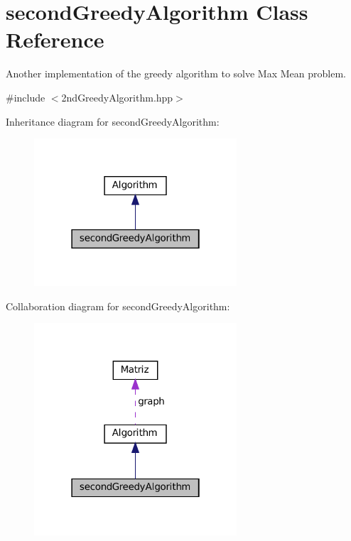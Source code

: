\hypertarget{classsecondGreedyAlgorithm}{}\section{second\+Greedy\+Algorithm Class Reference}
\label{classsecondGreedyAlgorithm}


Another implementation of the greedy algorithm to solve Max Mean problem.  




{\ttfamily \#include $<$2nd\+Greedy\+Algorithm.\+hpp$>$}



Inheritance diagram for second\+Greedy\+Algorithm\+:\nopagebreak
\begin{figure}[H]
\begin{center}
\leavevmode
\includegraphics[width=214pt]{classsecondGreedyAlgorithm__inherit__graph}
\end{center}
\end{figure}


Collaboration diagram for second\+Greedy\+Algorithm\+:\nopagebreak
\begin{figure}[H]
\begin{center}
\leavevmode
\includegraphics[width=214pt]{classsecondGreedyAlgorithm__coll__graph}
\end{center}
\end{figure}
